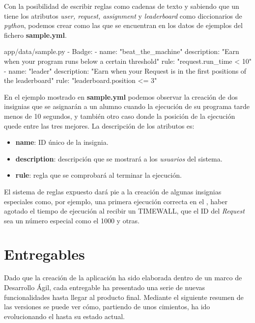 \documentclass[11pt,spanish,listoffigures,listoftables]{tfgetsinf}
\begin{document}
Con la posibilidad de escribir reglas como cadenas de texto y sabiendo que un  tiene los atributos \textit{user, request, assignment} y \textit{leaderboard} como diccionarios de \textit{python}, podemos crear  como las que se encuentran en los datos de ejemplos del fichero \textbf{sample.yml}. \newline

\begin{code}{app/data/sample.py}
- Badge:
	- name: "beat_the_machine"
	description: "Earn when your program runs below a certain threshold"
	rule: "request.run_time < 10"
	- name: "leader"
	description: "Earn when your Request is in the first positions of the leaderboard"
	rule: "leaderboard.position <= 3"
\end{code}

En el ejemplo mostrado en \textbf{sample.yml} podemos observar la creación de dos \gls{insignia}s que se asignarán a un \gls{alumno} cuando la ejecución de su programa tarde menos de 10 segundos, y también otro caso donde la posición de la ejecución quede entre las tres mejores. La descripción de los atributos es:

\begin{itemize}
	\item \textbf{name}: ID único de la \gls{insignia}.
	\item \textbf{description}: descripción que se mostrará a los \textit{usuarios} del sistema.
	\item \textbf{rule}: regla que se comprobará al terminar la ejecución.
\end{itemize}

El sistema de reglas expuesto dará pie a la creación de algunas \gls{insignia}s especiales como, por ejemplo, una primera ejecución correcta en el , haber agotado el tiempo de ejecución al recibir un TIMEWALL, que el ID del \textit{Request} sea un número especial como el 1000 y otras.

\section{Entregables}

Dado que la creación de la aplicación ha sido elaborada dentro de un marco de Desarrollo Ágil, cada entregable ha presentado una serie de nuevas funcionalidades hasta llegar al producto final. Mediante el siguiente resumen de las versiones se puede ver cómo, partiendo de unos cimientos, ha ido evolucionando el  hasta su estado actual.
\end{document}
